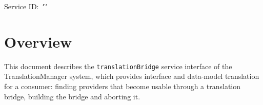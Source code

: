 \documentclass[a4paper]{arrowhead}
\begin{document}
\sloppy

\ArrowheadSetup

\begin{center}
  \vspace*{1cm}
  \huge{\arrowtitle}

  \vspace*{0.2cm}
  \LARGE{\arrowtype}
  \vspace*{1cm}

  \Large{Service ID: \textit{"\arrowid"}}

  \vspace*{\fill}


  \vspace*{1cm}
  \vspace*{\fill}

  \begin{abstract}
    This document describes the HTTP/1.1 protocol with TLS payload security and JSON payload encoding variant of the \texttt{translationBridge} service of the TranslationManager system.
  \end{abstract}

  \vspace*{1cm}
\end{center}

\newpage

\tableofcontents
\newpage

\section{Overview}
\label{sec:overview}

This document describes the \texttt{translationBridge} service interface of the TranslationManager system, which provides interface and data-model translation for a consumer: finding providers that become usable through a translation bridge, building the bridge and aborting it.
\end{document}
